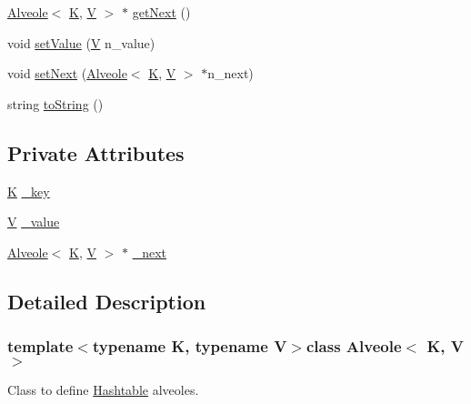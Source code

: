 \begin{DoxyCompactItemize}
\hyperlink{class_alveole}{Alveole}$<$ \hyperlink{sample__hashtable_8cpp_a97d832ae23af4f215e801e37e4f94254}{K}, \hyperlink{sample__hashtable_8cpp_af40a326b23c68a27cebe60f16634a2cb}{V} $>$ $\ast$ \hyperlink{class_alveole_ae540dba4d60c74ff17e2abc03deb33c8}{get\-Next} ()
\item 
void \hyperlink{class_alveole_a52932b33fef397328eea9ab139d1621e}{set\-Value} (\hyperlink{sample__hashtable_8cpp_af40a326b23c68a27cebe60f16634a2cb}{V} n\-\_\-value)
\item 
void \hyperlink{class_alveole_ad756cdf41a7ab00c93c2264c0a1da26c}{set\-Next} (\hyperlink{class_alveole}{Alveole}$<$ \hyperlink{sample__hashtable_8cpp_a97d832ae23af4f215e801e37e4f94254}{K}, \hyperlink{sample__hashtable_8cpp_af40a326b23c68a27cebe60f16634a2cb}{V} $>$ $\ast$n\-\_\-next)
\item 
string \hyperlink{class_alveole_a504981011163116c40d710a0e1d26a81}{to\-String} ()
\end{DoxyCompactItemize}
\subsection*{Private Attributes}
\begin{DoxyCompactItemize}
\item 
\hyperlink{sample__hashtable_8cpp_a97d832ae23af4f215e801e37e4f94254}{K} \hyperlink{class_alveole_aebb26347bcaaaf2c0cbe96903b63bc70}{\-\_\-key}
\item 
\hyperlink{sample__hashtable_8cpp_af40a326b23c68a27cebe60f16634a2cb}{V} \hyperlink{class_alveole_a50952a1693019a7ca857df267c047c84}{\-\_\-value}
\item 
\hyperlink{class_alveole}{Alveole}$<$ \hyperlink{sample__hashtable_8cpp_a97d832ae23af4f215e801e37e4f94254}{K}, \hyperlink{sample__hashtable_8cpp_af40a326b23c68a27cebe60f16634a2cb}{V} $>$ $\ast$ \hyperlink{class_alveole_aa566b7335f9ef0dc83ad2a596e659f90}{\-\_\-next}
\end{DoxyCompactItemize}


\subsection{Detailed Description}
\subsubsection*{template$<$typename K, typename V$>$class Alveole$<$ K, V $>$}

Class to define \hyperlink{class_hashtable}{Hashtable} alveoles. 

